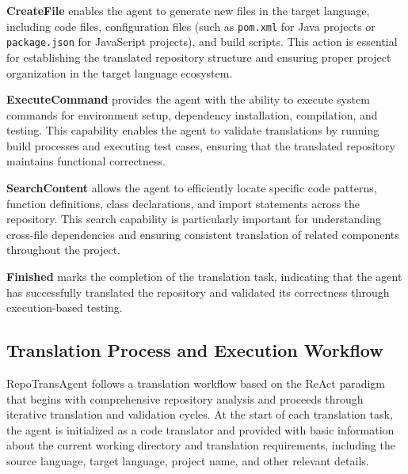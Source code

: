 \textbf{CreateFile} enables the agent to generate new files in the target language, including code files, configuration files (such as \texttt{pom.xml} for Java projects or \texttt{package.json} for JavaScript projects), and build scripts. This action is essential for establishing the translated repository structure and ensuring proper project organization in the target language ecosystem.

\textbf{ExecuteCommand} provides the agent with the ability to execute system commands for environment setup, dependency installation, compilation, and testing. This capability enables the agent to validate translations by running build processes and executing test cases, ensuring that the translated repository maintains functional correctness.

\textbf{SearchContent} allows the agent to efficiently locate specific code patterns, function definitions, class declarations, and import statements across the repository. This search capability is particularly important for understanding cross-file dependencies and ensuring consistent translation of related components throughout the project.

\textbf{Finished} marks the completion of the translation task, indicating that the agent has successfully translated the repository and validated its correctness through execution-based testing.

\subsection{Translation Process and Execution Workflow}

RepoTransAgent follows a translation workflow based on the ReAct paradigm that begins with comprehensive repository analysis and proceeds through iterative translation and validation cycles. At the start of each translation task, the agent is initialized as a code translator and provided with basic information about the current working directory and translation requirements, including the source language, target language, project name, and other relevant details.


